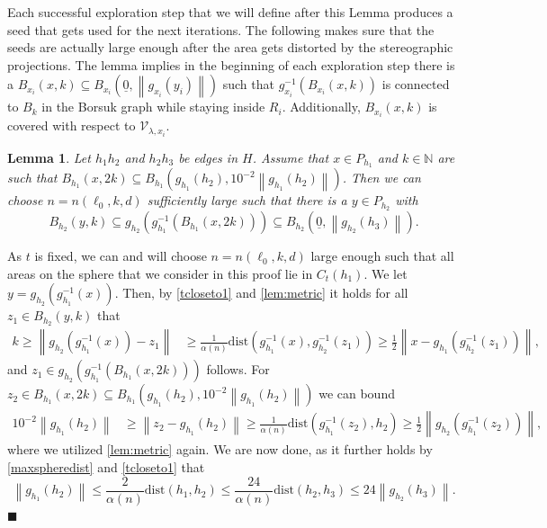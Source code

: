 \documentclass[11pt]{article}%
\newenvironment{proof}{\vspace{1ex}\noindent{\bf Proof.}}{\hspace*{\fill}$\blacksquare$\vspace{1ex}}
\newtheorem{lemma}[lemma]{Lemma}
\newcommand{\norm}[1]{\ensuremath{\left\|#1\right\|}}
\newcommand{\NN}{\mathbb{N}}
\newcommand{\dists}{{\mathrm{dist}}}
\newcommand{\typ}{\underline{0}}
\begin{document}
\noindent
Each successful exploration step that we will define after this Lemma produces a seed that gets used for the next iterations. The following makes sure that the seeds are actually large enough after the area gets distorted by the stereographic projections. The lemma implies in the beginning of each exploration step there is a $ B_{x_i}(x,k)\subseteq B_{x_i}(\typ,\norm{g_{x_i}(y_i)}) $ such that $ g^{-1}_{x_i}(B_{x_i}(x,k)) $ is connected to $ B_k $ in the Borsuk graph while staying inside $ R_i $. Additionally, $ B_{x_i}(x,k) $ is covered with respect to $ \mathcal{V}_{\lambda,x_i} $. 
		\begin{lemma}\label{restart}
		Let $ h_1h_2 $ and $ h_2h_3 $ be edges in $ H $. Assume that $ x\in P_{h_1} $ and $ k\in\NN $ are such that $B_{h_1}(x,2k)\subseteq B_{h_1}(g_{h_1}(h_2),10^{-2}\norm{g_{h_1}(h_2)}) $. Then we can choose $ n=n(\ell_0,k,d) $ sufficiently large such that there is a $ y\in P_{h_2} $ with
		\begin{equation*}
			B_{h_2}(y,k)\subseteq g_{h_2}(g^{-1}_{h_1}(B_{h_1}(x,2k))) \subseteq B_{h_2}(\typ,\norm{g_{h_2}(h_3)}).
		\end{equation*} 
	\end{lemma}
	\begin{proof}
		As $ t $ is fixed, we can and will choose  $  n=n(\ell_0,k,d)  $ large enough such that all areas on the sphere that we consider in this proof lie in $ C_{t}(h_1) $. We let $ y= g_{h_2}(g^{-1}_{h_1}(x)) $. Then, by \cref{tcloseto1} and \cref{lem:metric} it holds for all $ z_1\in B_{h_2}(y,k) $ that
		\begin{equation*}
			\begin{split}
				k\geq \norm{ g_{h_2}(g^{-1}_{h_1}(x))-z_1} &\geq \frac{1}{\alpha(n)}\dists(g^{-1}_{h_1}(x),g_{h_2}^{-1}(z_1))\geq \frac{1}{2}\norm{x-g_{h_1}(g^{-1}_{h_2}(z_1))},
			\end{split}
		\end{equation*}
		and $ z_1\in g_{h_2}(g^{-1}_{h_1}(B_{h_1}(x,2k))) $ follows. For $ z_2\in B_{h_1}(x,2k)\subseteq B_{h_1}(g_{h_1}(h_2),10^{-2}\norm{g_{h_1}(h_2)}) $ we can bound
		\begin{equation*}
			\begin{split}
				10^{-2}{\norm{g_{h_1}(h_2)}}&\geq \norm{z_2-g_{h_1}(h_2)}\geq \frac{1}{\alpha(n)}\dists(g^{-1}_{h_1}(z_2),h_2)\geq \frac{1}{2}\norm{g_{h_2}(g^{-1}_{h_1}(z_2) )},
			\end{split}
		\end{equation*}
		where we utilized \cref{lem:metric} again. We are now done, as it further holds by \cref{maxspheredist} and \cref{tcloseto1} that
		\begin{equation*}
			\norm{g_{h_1}(h_2)}\leq \frac{2}{\alpha(n)}\dists(h_1,h_2)\leq \frac{24}{\alpha(n)} \dists(h_2,h_3)\leq 24 \norm{g_{h_2}(h_3)}.
		\end{equation*} 
	\end{proof}	  
\end{document}
